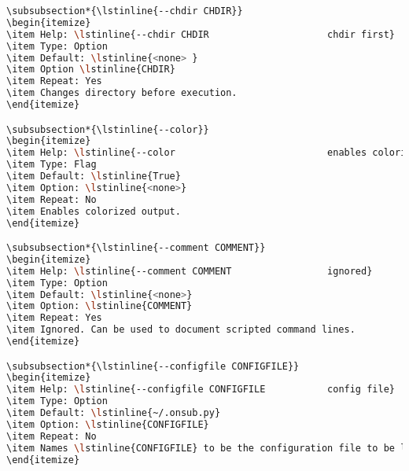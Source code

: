 \begin{snugshade}
\begin{lstlisting}[language=bash]
\subsubsection*{\lstinline{--chdir CHDIR}}
\begin{itemize}
\item Help: \lstinline{--chdir CHDIR                     chdir first}
\item Type: Option
\item Default: \lstinline{<none> }
\item Option \lstinline{CHDIR}
\item Repeat: Yes
\item Changes directory before execution.
\end{itemize}

\subsubsection*{\lstinline{--color}}
\begin{itemize}
\item Help: \lstinline{--color                           enables colorized output}
\item Type: Flag
\item Default: \lstinline{True}
\item Option: \lstinline{<none>}
\item Repeat: No
\item Enables colorized output.
\end{itemize}

\subsubsection*{\lstinline{--comment COMMENT}}
\begin{itemize}
\item Help: \lstinline{--comment COMMENT                 ignored}
\item Type: Option
\item Default: \lstinline{<none>}
\item Option: \lstinline{COMMENT}
\item Repeat: Yes
\item Ignored. Can be used to document scripted command lines.
\end{itemize}

\subsubsection*{\lstinline{--configfile CONFIGFILE}}
\begin{itemize}
\item Help: \lstinline{--configfile CONFIGFILE           config file}
\item Type: Option
\item Default: \lstinline{~/.onsub.py}
\item Option: \lstinline{CONFIGFILE}
\item Repeat: No
\item Names \lstinline{CONFIGFILE} to be the configuration file to be loaded.
\end{itemize}


\end{lstlisting}
\end{snugshade}
